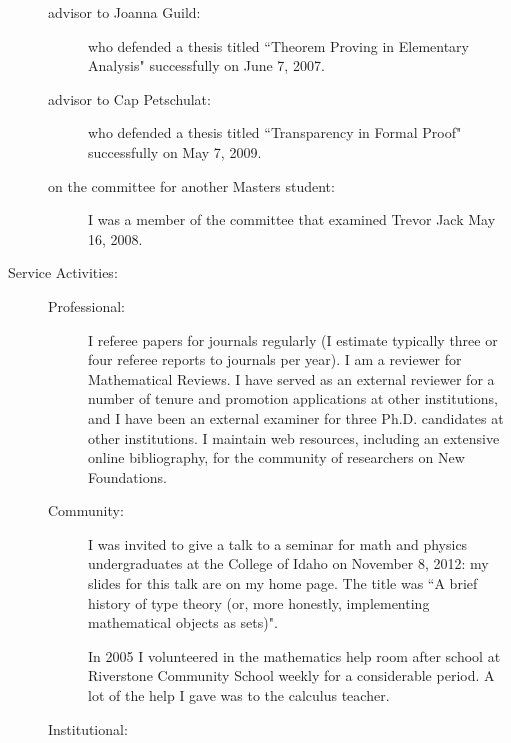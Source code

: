 \begin{description}
\begin{description}
\item[]

\item[advisor to Joanna Guild:]  who defended a thesis titled ``Theorem Proving in Elementary Analysis" successfully on June 7, 2007.

\item[advisor to Cap Petschulat:]  who defended a thesis titled ``Transparency in Formal Proof" successfully on May 7, 2009.

\item[on the committee for another Masters student:]  I was a member of the committee that examined Trevor Jack  May 16, 2008.

\end{description}

\newpage

\item[Service Activities:]

\begin{description}

\item[]

\item[Professional:]  I referee papers for journals regularly (I estimate typically three or four referee reports to journals per year).  I am a reviewer for Mathematical Reviews.  I have served as an external reviewer for a number of tenure and promotion applications at other institutions, and I have been an external examiner for three Ph.D. candidates at other institutions.  I maintain web resources, including an extensive online bibliography, for the community of researchers on New Foundations.

\item[Community:]  I was invited to give a talk to a seminar for math and physics undergraduates at the College of Idaho on November 8, 2012:  my slides for this talk are on my home page.  The title was ``A brief history of type theory (or, more honestly, implementing mathematical objects as sets)".   

In 2005 I volunteered in the mathematics help room after school at Riverstone Community School weekly for a considerable period.  A lot of the help I gave was to the calculus teacher.

\item[Institutional:] 

\begin{description}

\item[]


\end{description}
\end{description}
\end{description}
